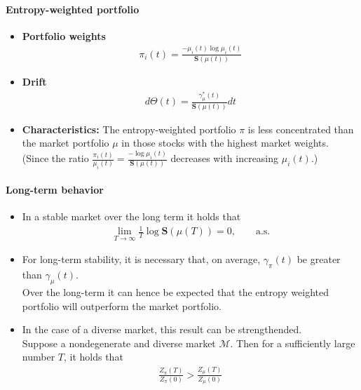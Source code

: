 \documentclass[a4paper,landscape,8pt,fleqn]{scrartcl}
\renewcommand{\emph}[1]{\textbf{#1}}
\begin{document}
\begin{multicols*}{3}
\paragraph{Entropy-weighted portfolio}

\begin{itemize}
\item \emph{Portfolio weights}
\begin{align*}
\pi_i(t) = \frac{-\mu_i(t) \log \mu_i(t)}{\pmb{S}(\mu(t))}
\end{align*}
\item \emph{Drift}
\begin{align*}
d\Theta(t) = \frac{\gamma_\mu^\ast(t)}{\pmb{S}(\mu(t))} dt
\end{align*}
\item \emph{Characteristics:} The entropy-weighted portfolio $\pi$ is less concentrated than the market portfolio $\mu$ in those stocks with the highest market weights. \\
(Since the ratio $\frac{\pi_i(t)}{\mu_i(t)} = \frac{-\log \mu_i(t)}{\pmb{S}(\mu(t))}$ decreases with increasing $\mu_i(t)$.)
\end{itemize}

\paragraph{Long-term behavior}

\begin{itemize}
\item In a stable market over the long term it holds that
\begin{align*}
\lim\limits_{T \to \infty} \frac{1}{T} \log \pmb{S}(\mu(T)) = 0, \qquad \text{a.s.}
\end{align*}
\item For long-term stability, it is necessary that, on average, $\gamma_\pi(t)$ be greater than $\gamma_\mu(t)$. \\
Over the long-term it can hence be expected that the entropy weighted portfolio will outperform the market portfolio.
\item In the case of a diverse market, this result can be strengthended. \\
Suppose a nondegenerate and diverse market $\mathcal{M}$. Then for a sufficiently large number $T$, it holds that
\begin{align*}
\frac{Z_\pi(T)}{Z_\pi(0)} > \frac{Z_\mu(T)}{Z_\mu(0)}
\end{align*}
\end{itemize}


\end{multicols*}
\end{document}
